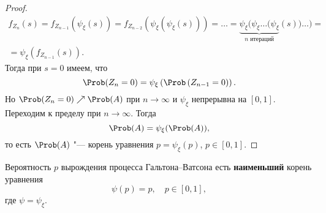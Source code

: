 \begin{proof}
\begin{multline*}
    f_{Z_{n}}(s) = f_{Z_{n-1}}(\psi_{\xi}(s)) = f_{Z_{n-2}} \left(\psi_{\xi} \left( \psi_{\xi} \left(s \right) \right) \right) = \ldots = \underbrace{\psi_{\xi} (\psi_{\xi} \ldots (\psi_{\xi}}_{\text{$n$ итераций}}(s)) \ldots ) = \\ = \psi_{\xi} (f_{Z_{n-1}} (s)){.}
  \end{multline*}
  Тогда при $s = 0$ имеем, что
  \begin{equation*}
    \Prob (Z_{n} = 0) = \psi_{\xi} \left( \Prob\left(Z_{n-1}=0 \right) \right) {.}
  \end{equation*}
  Но $\Prob(Z_{n} = 0) \nearrow \Prob(A)$ при $n \to \infty$ и $\psi_{\xi}$ непрерывна на $[0, 1]$.
  Переходим к пределу при $n \to \infty$. Тогда
  \begin{equation*}
    \Prob(A) = \psi_{\xi} (\Prob(A)){,}
  \end{equation*}
  то есть $\Prob(A)$ "--- корень уравнения $p = \psi_{\xi}(p)$, $p \in [0, 1]$.
\end{proof}

\begin{thm}
  Вероятность $p$ вырождения процесса Гальтона--Ватсона есть \textbf{наименьший} корень уравнения
  \begin{equation}
    \label{eq1}
    \psi(p) = p, \quad p \in [0, 1]{,}
  \end{equation}
  где $\psi = \psi_{\xi}$.
\end{thm}


